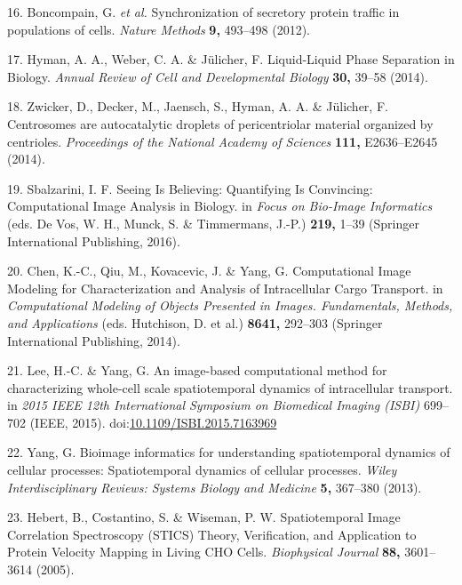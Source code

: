 \documentclass[12pt,a4paper,]{Dissertate}
\begin{document}
\leavevmode\hypertarget{ref-boncompain_synchronization_2012}{}%
16. Boncompain, G. \emph{et al.} Synchronization of secretory protein
traffic in populations of cells. \emph{Nature Methods} \textbf{9,}
493--498 (2012).

\leavevmode\hypertarget{ref-hyman_liquid-liquid_2014}{}%
17. Hyman, A. A., Weber, C. A. \& Jülicher, F. Liquid-Liquid Phase
Separation in Biology. \emph{Annual Review of Cell and Developmental
Biology} \textbf{30,} 39--58 (2014).

\leavevmode\hypertarget{ref-zwicker_centrosomes_2014}{}%
18. Zwicker, D., Decker, M., Jaensch, S., Hyman, A. A. \& Jülicher, F.
Centrosomes are autocatalytic droplets of pericentriolar material
organized by centrioles. \emph{Proceedings of the National Academy of
Sciences} \textbf{111,} E2636--E2645 (2014).

\leavevmode\hypertarget{ref-de_vos_seeing_2016}{}%
19. Sbalzarini, I. F. Seeing Is Believing: Quantifying Is Convincing:
Computational Image Analysis in Biology. in \emph{Focus on Bio-Image
Informatics} (eds. De Vos, W. H., Munck, S. \& Timmermans, J.-P.)
\textbf{219,} 1--39 (Springer International Publishing, 2016).

\leavevmode\hypertarget{ref-hutchison_computational_2014}{}%
20. Chen, K.-C., Qiu, M., Kovacevic, J. \& Yang, G. Computational Image
Modeling for Characterization and Analysis of Intracellular Cargo
Transport. in \emph{Computational Modeling of Objects Presented in
Images. Fundamentals, Methods, and Applications} (eds. Hutchison, D. et
al.) \textbf{8641,} 292--303 (Springer International Publishing, 2014).

\leavevmode\hypertarget{ref-lee_image-based_2015}{}%
21. Lee, H.-C. \& Yang, G. An image-based computational method for
characterizing whole-cell scale spatiotemporal dynamics of intracellular
transport. in \emph{2015 IEEE 12th International Symposium on Biomedical
Imaging (ISBI)} 699--702 (IEEE, 2015).
doi:\href{https://doi.org/10.1109/ISBI.2015.7163969}{10.1109/ISBI.2015.7163969}

\leavevmode\hypertarget{ref-yang_bioimage_2013}{}%
22. Yang, G. Bioimage informatics for understanding spatiotemporal
dynamics of cellular processes: Spatiotemporal dynamics of cellular
processes. \emph{Wiley Interdisciplinary Reviews: Systems Biology and
Medicine} \textbf{5,} 367--380 (2013).

\leavevmode\hypertarget{ref-hebert_spatiotemporal_2005}{}%
23. Hebert, B., Costantino, S. \& Wiseman, P. W. Spatiotemporal Image
Correlation Spectroscopy (STICS) Theory, Verification, and Application
to Protein Velocity Mapping in Living CHO Cells. \emph{Biophysical
Journal} \textbf{88,} 3601--3614 (2005).
\end{document}
